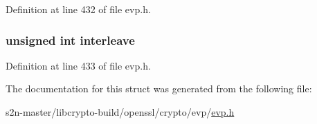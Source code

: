 Definition at line 432 of file evp.\+h.

\subsubsection[{\texorpdfstring{interleave}{interleave}}]{\setlength{\rightskip}{0pt plus 5cm}unsigned int interleave}\hypertarget{struct_e_v_p___c_t_r_l___t_l_s1__1___m_u_l_t_i_b_l_o_c_k___p_a_r_a_m_a457dc3279df296fd7d71294877603ee0}{}\label{struct_e_v_p___c_t_r_l___t_l_s1__1___m_u_l_t_i_b_l_o_c_k___p_a_r_a_m_a457dc3279df296fd7d71294877603ee0}


Definition at line 433 of file evp.\+h.



The documentation for this struct was generated from the following file\+:\begin{DoxyCompactItemize}
\item 
s2n-\/master/libcrypto-\/build/openssl/crypto/evp/\hyperlink{crypto_2evp_2evp_8h}{evp.\+h}\end{DoxyCompactItemize}
